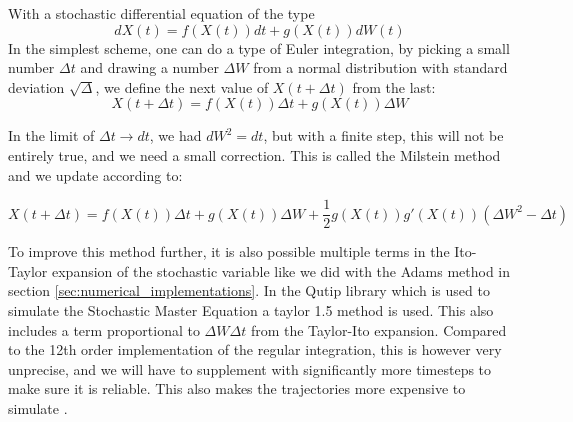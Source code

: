 With a stochastic differential equation of the type 
\begin{equation}\label{eq:stochastic_diff_equation_numerical}
    dX(t) = f(X(t))dt + g(X(t)) dW(t) 
\end{equation}
In the simplest scheme, one can do a type of Euler integration, by picking a small number $\Delta t$ and drawing a number $\Delta W$ from a normal distribution with standard deviation $\sqrt{\Delta}$, we define the next value of $X(t + \Delta t)$ from the last:
\begin{equation}
    X(t + \Delta t) = f(X(t))\Delta t + g(X(t)) \Delta W
\end{equation}

In the limit of $\Delta t \to dt$, we had $dW^2 = dt$, but with a finite step, this will not be entirely true, and we need a small correction. This is called the Milstein method \cite{giles} and we update according to:
\begin{fullwidth}
\raggedleft
\begin{equation}
    X(t + \Delta t) = f(X(t))\Delta t + g(X(t)) \Delta W + \frac12 g(X(t))g'(X(t))\left(\Delta W^2 - \Delta t \right)
\end{equation}
\end{fullwidth}
To improve this method further, it is also possible multiple terms in the Ito-Taylor expansion of the stochastic variable like we did with the Adams method in section \ref{sec:numerical_implementations}. In the Qutip library which is used to simulate the Stochastic Master Equation a taylor 1.5 method is used. This also includes a term proportional to $\Delta W \Delta t$ from the Taylor-Ito expansion. Compared to the 12th order implementation of the regular integration, this is however very unprecise, and we will have to supplement with significantly more timesteps to make sure it is reliable. This also makes the trajectories more expensive to simulate \cite{johansson_qutip_2012}.



